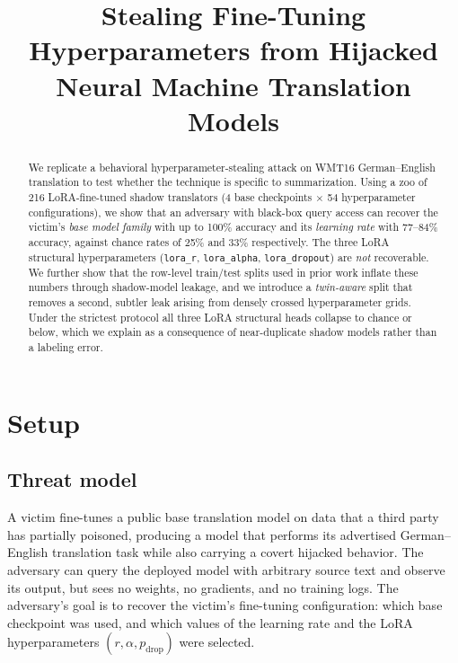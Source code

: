 \documentclass[11pt]{article}
\title{Stealing Fine-Tuning Hyperparameters from Hijacked\\
       Neural Machine Translation Models}
\author{}
\date{}
\newcommand{\hd}[1]{\texttt{#1}}
\begin{document}
\maketitle

\begin{abstract}
We replicate a behavioral hyperparameter-stealing attack on WMT16 German--English
translation to test whether the technique is specific to summarization. Using a zoo of
216 LoRA-fine-tuned shadow translators (4 base checkpoints $\times$ 54 hyperparameter
configurations), we show that an adversary with black-box query access can recover the
victim's \emph{base model family} with up to 100\% accuracy and its \emph{learning rate}
with 77--84\% accuracy, against chance rates of 25\% and 33\% respectively. The three
LoRA structural hyperparameters (\hd{lora\_r}, \hd{lora\_alpha}, \hd{lora\_dropout}) are
\emph{not} recoverable. We further show that the row-level train/test splits used in
prior work inflate these numbers through shadow-model leakage, and we introduce a
\emph{twin-aware} split that removes a second, subtler leak arising from densely crossed
hyperparameter grids. Under the strictest protocol all three LoRA structural heads
collapse to chance or below, which we explain as a consequence of near-duplicate shadow
models rather than a labeling error.
\end{abstract}

\section{Setup}
\label{sec:trans-setup}

\subsection{Threat model}

A victim fine-tunes a public base translation model on data that a third party has
partially poisoned, producing a model that performs its advertised German--English
translation task while also carrying a covert hijacked behavior. The adversary can query
the deployed model with arbitrary source text and observe its output, but sees no weights,
no gradients, and no training logs. The adversary's goal is to recover the victim's
fine-tuning configuration: which base checkpoint was used, and which values of the
learning rate and the LoRA hyperparameters $(r, \alpha, p_{\text{drop}})$ were selected.
\end{document}
